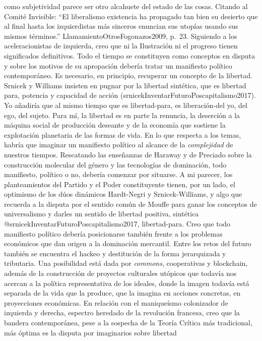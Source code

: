 \documentclass[
]{article}
\begin{document}
como subjetividad parece ser otro alcahuete del estado de las cosas.
Citando al Comité Invisible: ``El liberalismo existencia ha propagado
tan bien su desierto que al final hasta los izquierdistas más sinceros
enuncian sus utopías usando sus mismos términos.''
LlamamientoOtrosFogonazos2009, p.~23. Siguiendo a los aceleracionistas
de izquierda, creo que ni la Ilustración ni el progreso tienen
significados definitivos. Todo el tiempo se constituyen como conceptos
en disputa y sobre los motivos de su apropación debería tratar un
manifiesto político contemporáneo. Es necesario, en principio, recuperar
un concepto de la libertad. Srnicek y Williams insisten en pugnar por la
libertad sintética, que es libertad para, potencia y capacidad de acción
(srnicekInventarFuturoPoscapitalismo2017). Yo añadiría que al mismo
tiempo que es libertad-para, es liberación-del yo, del ego, del sujeto.
Para mí, la libertad es en parte la renuncia, la deserción a la máquina
social de producción deseante y de la economía que sostiene la
explotación planetaria de las formas de vida. En lo que respecta a los
temas, habría que imaginar un manifiesto político al alcance de la
\emph{complejidad} de nuestros tiempos. Rescatando las enseñanzas de
Haraway y de Preciado sobre la construcción molecular del género y las
tecnologías de dominación, todo manifiesto, político o no, debería
comenzar por situarse. A mi parecer, los planteamientos del Partido y el
Poder constituyente tienen, por un lado, el optimismo de los dúos
dinámicos Hardt-Negri y Srnicek-Williams, y algo que recuerda a la
disputa por el sentido común de Mouffe para ganar los conceptos de
universalismo y darles un sentido de libertad positiva, sintética
@srnicekInventarFuturoPoscapitalismo2017, libertad-para. Creo que todo
manifiesto político debería posicionarse también frente a los problemas
económicos que dan origen a la dominación mercantil. Entre los retos del
futuro también se encuentra el hackeo y destitución de la forma
jerarquizada y tributaria. Una posibilidad está dada por \emph{commons},
cooperativas y blockchain, además de la construcción de proyectos
culturales utópicos que todavía nos acercan a la política representativa
de los ideales, donde la imagen todavía está separada de la vida que la
produce, que la imagina en acciones concretas, en proyecciones
económicas. En relación con el maniqueísmo colonizador de izquierda y
derecha, espectro heredado de la revolución francesa, creo que la
bandera contemporánea, pese a la sospecha de la Teoría Crítica más
tradicional, más óptima es la disputa por imaginarios sobre libertad
\end{document}
